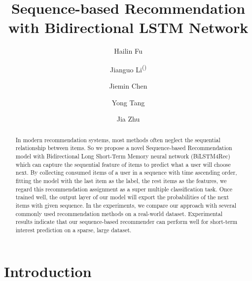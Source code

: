 \documentclass[runningheads]{llncs}
\begin{document}
%
\title{Sequence-based Recommendation with Bidirectional LSTM Network}
%
%
\author{Hailin Fu \and Jianguo Li\textsuperscript{(\Letter)} \and Jiemin Chen \and Yong Tang \and Jia Zhu}
%
%
%
\maketitle              %
%
\begin{abstract}
In modern recommendation systems, most methods often neglect the sequential relationship between items. So we propose a novel Sequence-based Recommendation model with Bidirectional  Long Short-Term Memory neural network (BiLSTM4Rec) which can capture the sequential feature of items to predict what a user will choose next. By collecting consumed items of a user in a sequence with time ascending order, fitting the model with the last item as the label, the rest items as the features, we regard this recommendation assignment as a super multiple classification task. Once trained well, the output layer of our model will export the probabilities of the next items with given sequence. In the experiments, we compare our approach with several commonly used recommendation methods on a real-world dataset. Experimental results indicate that our sequence-based recommender can perform well for short-term interest prediction on a sparse, large dataset.

\end{abstract}
% 
%
%
\section{Introduction}
\end{document}
